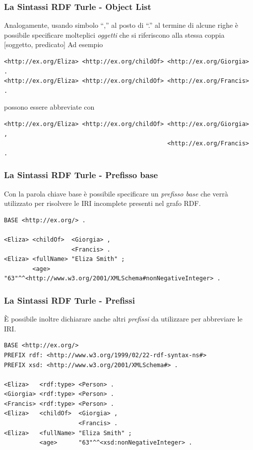 \documentclass[8pt]{beamer}
\begin{document}
\begin{frame}[fragile]
 \frametitle{La Sintassi RDF Turle - Object List}
Analogamente, usando simbolo ``,'' al posto di ``.'' al termine di alcune righe \`e possibile
specificare molteplici \emph{oggetti} che si riferiscono alla stessa coppia [soggetto, predicato]
Ad esempio

\begin{Verbatim}[fontsize=\small]
<http://ex.org/Eliza> <http://ex.org/childOf> <http://ex.org/Giorgia> .
<http://ex.org/Eliza> <http://ex.org/childOf> <http://ex.org/Francis> .
\end{Verbatim}

possono essere abbreviate con
\begin{Verbatim}[fontsize=\small]
<http://ex.org/Eliza> <http://ex.org/childOf> <http://ex.org/Giorgia> ,
                                              <http://ex.org/Francis> .
\end{Verbatim}
\end{frame}
 
\begin{frame}[fragile]
 \frametitle{La Sintassi RDF Turle - Prefisso base}

Con la parola chiave base \`e possibile specificare un \emph{prefisso base}
che verr\`a utilizzato per risolvere le IRI incomplete presenti nel grafo RDF.

\begin{Verbatim}[fontsize=\small]
BASE <http://ex.org/> .

<Eliza> <childOf>  <Giorgia> ,
                   <Francis> .
<Eliza> <fullName> "Eliza Smith" ;
        <age> "63"^^<http://www.w3.org/2001/XMLSchema#nonNegativeInteger> .
\end{Verbatim}
\end{frame}

\begin{frame}[fragile]
 \frametitle{La Sintassi RDF Turle - Prefissi}

\`E possibile inoltre dichiarare anche altri \emph{prefissi} da utilizzare
per abbreviare le IRI.

\begin{Verbatim}[fontsize=\small]
BASE <http://ex.org/>
PREFIX rdf: <http://www.w3.org/1999/02/22-rdf-syntax-ns#>
PREFIX xsd: <http://www.w3.org/2001/XMLSchema#> .

<Eliza>   <rdf:type> <Person> .
<Giorgia> <rdf:type> <Person> .
<Francis> <rdf:type> <Person> .
<Eliza>   <childOf>  <Giorgia> ,
                     <Francis> . 
<Eliza>   <fullName> "Eliza Smith" ;
          <age>      "63"^^<xsd:nonNegativeInteger> .
\end{Verbatim}
\end{frame}
\end{document}
